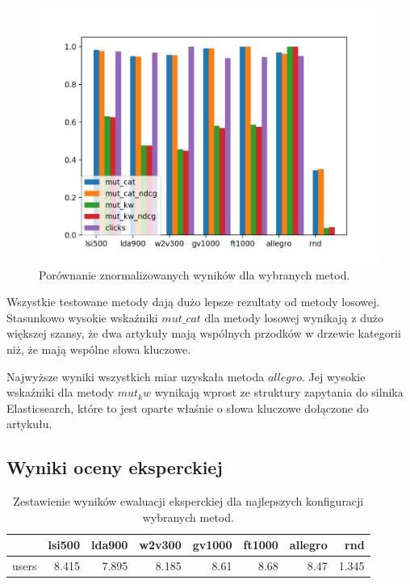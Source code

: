 \documentclass[pl]{minipw} %
\begin{document}
\begin{figure}[H]
	\centering
	\includegraphics[width=1\textwidth]{img/results/lsi500_lda900_w2v300_gv1000_ft1000_allegro_rnd_.png}
	\caption{Porównanie znormalizowanych wyników dla wybranych metod.}
\end{figure}

Wszystkie testowane metody dają dużo lepsze rezultaty od metody losowej. Stasunkowo wysokie wskaźniki $mut\_cat$ dla metody losowej wynikają z dużo większej szansy, że dwa artykuły mają wspólnych przodków w drzewie kategorii niż, że mają wspólne słowa kluczowe.

Najwyższe wyniki wszystkich miar uzyskała metoda $allegro$. Jej wysokie wskaźniki dla metody $mut_kw$ wynikają wprost ze struktury zapytania do silnika Elasticsearch, które to jest oparte właśnie o słowa kluczowe dołączone do artykułu.

\subsection{Wyniki oceny eksperckiej}

\begin{table}
	\centering
	\begin{tabular}{lrrrrrrr}
		\hline
		&   lsi500 &   lda900 &   w2v300 &   gv1000 &   ft1000 &   allegro &   rnd \\
		\hline
		users &    8.415 &    7.895 &    8.185 &     8.61 &     8.68 &      8.47 & 1.345 \\
		\hline
	\end{tabular}
	\caption{Zestawienie wyników ewaluacji eksperckiej dla najlepszych konfiguracji wybranych metod.}
\end{table}
\end{document}
